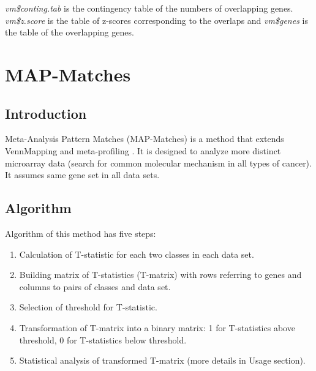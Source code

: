 \documentclass[a4paper]{report}
\begin{document}
\emph{vm\$conting.tab} is the contingency table of the numbers of overlapping genes. \emph{vm\$z.score} is the table of z-scores corresponding to the overlaps and \emph{vm\$genes} is the table of the overlapping genes. 


\chapter{MAP-Matches}
\section*{Introduction}
Meta-Analysis Pattern Matches (MAP-Matches) \cite{Yang2005} is a method that extends VennMapping \cite{Smid} and meta-profiling \cite{velkyRhodes}. It is designed to analyze more distinct microarray data (search for common molecular mechanism in all types of cancer). It assumes same gene set in all data sets. 
\section*{Algorithm}
Algorithm of this method has five steps:
\begin{enumerate}
\item Calculation of T-statistic for each two classes in each data set. 
\item Building matrix of T-statistics (T-matrix) with rows referring to genes and columns to pairs of classes and data set.
\item Selection of threshold for T-statistic.
\item Transformation of T-matrix into a binary matrix: 1 for T-statistics above threshold, 0 for T-statistics below threshold.
\item Statistical analysis of transformed T-matrix (more details in Usage section).  
\end{enumerate}
\end{document}
